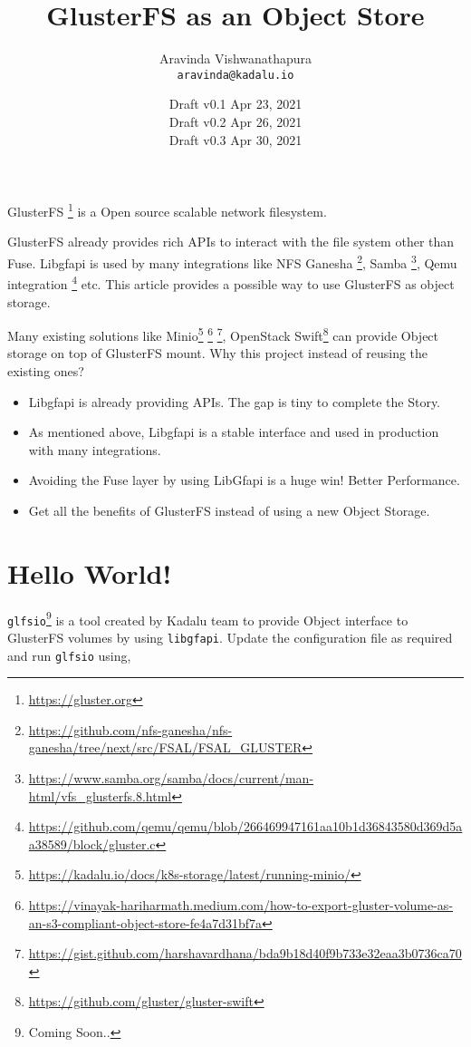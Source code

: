 \documentclass[10pt,a4paper]{article}
\title{GlusterFS as an Object Store}
\author{
	Aravinda Vishwanathapura\\
	\texttt{aravinda@kadalu.io}
}
\date{
	Draft v0.1 Apr 23, 2021\\
	Draft v0.2 Apr 26, 2021\\
	Draft v0.3 Apr 30, 2021\\
}
\begin{document}
\maketitle

\begin{multicols*}{2}
GlusterFS \footnote{\url{https://gluster.org}} is a Open source scalable network filesystem.

GlusterFS already provides rich APIs to interact with the file system other than Fuse. Libgfapi is used by many integrations like NFS Ganesha \footnote{\url{https://github.com/nfs-ganesha/nfs-ganesha/tree/next/src/FSAL/FSAL_GLUSTER}}, Samba \footnote{\url{https://www.samba.org/samba/docs/current/man-html/vfs_glusterfs.8.html}}, Qemu integration \footnote{\url{https://github.com/qemu/qemu/blob/266469947161aa10b1d36843580d369d5aa38589/block/gluster.c}} etc. This article provides a possible way to use GlusterFS as object storage.

Many existing solutions like Minio\footnote{\url{https://kadalu.io/docs/k8s-storage/latest/running-minio/}} \footnote{\url{https://vinayak-hariharmath.medium.com/how-to-export-gluster-volume-as-an-s3-compliant-object-store-fe4a7d31bf7a}} \footnote{\url{https://gist.github.com/harshavardhana/bda9b18d40f9b733e32eaa3b0736ca70}}, OpenStack Swift\footnote{\url{https://github.com/gluster/gluster-swift}} can provide Object storage on top of GlusterFS mount. Why this project instead of reusing the existing ones?

\begin{itemize}
\item Libgfapi is already providing APIs. The gap is tiny to complete the Story.
\item As mentioned above, Libgfapi is a stable interface and used in production with many integrations.
\item Avoiding the Fuse layer by using LibGfapi is a huge win! Better Performance.
\item Get all the benefits of GlusterFS instead of using a new Object Storage.
\end{itemize}

\section{Hello World!}
\texttt{glfsio}\footnote{Coming Soon..} is a tool created by Kadalu team to provide Object interface to GlusterFS volumes by using \texttt{libgfapi}. Update the configuration file as required and run \texttt{glfsio} using,


\end{multicols*}
\end{document}
